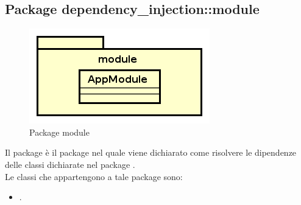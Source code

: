 \documentclass[../Tesi.tex]{subfiles}
\begin{document}
	\subsection{Package dependency\_injection::module}
		\begin{figure}[H]
			\centering
			\includegraphics[scale=0.6]{images/package_diagrams/module}
				\caption{Package module}
			\label{fig:StrutturaMVP}
		\end{figure}
		Il package  è il package nel quale viene dichiarato come risolvere le dipendenze delle classi dichiarate nel package . \\
		Le classi che appartengono a tale package sono:
		\begin{itemize}
			\item {}.
		\end{itemize}
\end{document}
